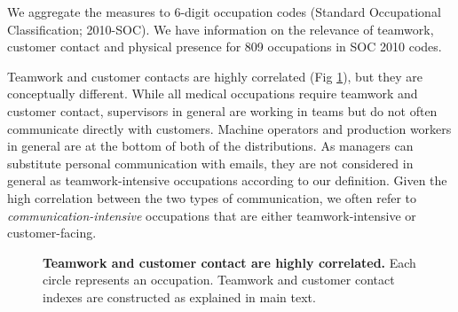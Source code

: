 We aggregate the measures to 6-digit occupation codes (Standard Occupational Classification; 2010-SOC). We have information on the relevance of teamwork, customer contact and physical presence  for 809 occupations in SOC 2010 codes.

Teamwork and customer contacts are highly correlated (Fig \ref{fig3}), but they are conceptually different. While all medical occupations require teamwork and customer contact, supervisors in general are working in teams but do not often communicate directly with customers. Machine operators and production workers in general are at the bottom of both of the distributions. As managers can substitute personal communication with emails, they are not considered in general as teamwork-intensive occupations according to our definition. Given the high correlation between the two types of communication, we often refer to \emph{communication-intensive} occupations that are either teamwork-intensive or customer-facing. 

\begin{figure}[!h]

\caption{{\bf Teamwork and customer contact are highly correlated.}
Each circle represents an occupation. Teamwork and customer contact indexes are constructed as explained in main text.}
\label{fig3}
\end{figure}



